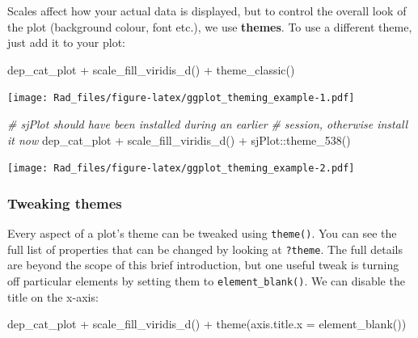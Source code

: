 \documentclass[
]{book}
\newenvironment{Shaded}{\begin{snugshade}}{\end{snugshade}}
\newcommand{\AttributeTok}[1]{\textcolor[rgb]{0.77,0.63,0.00}{#1}}
\newcommand{\CommentTok}[1]{\textcolor[rgb]{0.56,0.35,0.01}{\textit{#1}}}
\newcommand{\FunctionTok}[1]{\textcolor[rgb]{0.00,0.00,0.00}{#1}}
\newcommand{\NormalTok}[1]{#1}
\newcommand{\SpecialCharTok}[1]{\textcolor[rgb]{0.00,0.00,0.00}{#1}}
\begin{document}
Scales affect how your actual data is displayed, but to control the
overall look of the plot (background colour, font etc.), we use
\textbf{themes}. To use a different theme, just add it to your plot:

\begin{Shaded}
\begin{Highlighting}[]
\NormalTok{dep\_cat\_plot }\SpecialCharTok{+}
    \FunctionTok{scale\_fill\_viridis\_d}\NormalTok{() }\SpecialCharTok{+}
    \FunctionTok{theme\_classic}\NormalTok{()}
\end{Highlighting}
\end{Shaded}

\texttt{[image: Rad\_files/figure-latex/ggplot\_theming\_example-1.pdf]}

\begin{Shaded}
\begin{Highlighting}[]
\CommentTok{\# sjPlot should have been installed during an earlier}
\CommentTok{\#   session, otherwise install it now}
\NormalTok{dep\_cat\_plot }\SpecialCharTok{+}
    \FunctionTok{scale\_fill\_viridis\_d}\NormalTok{() }\SpecialCharTok{+}
\NormalTok{    sjPlot}\SpecialCharTok{::}\FunctionTok{theme\_538}\NormalTok{()}
\end{Highlighting}
\end{Shaded}

\texttt{[image: Rad\_files/figure-latex/ggplot\_theming\_example-2.pdf]}

\hypertarget{tweaking-themes}{%
\subsubsection{Tweaking themes}\label{tweaking-themes}}

Every aspect of a plot's theme can be tweaked using \texttt{theme()}.
You can see the full list of properties that can be changed by looking
at \texttt{?theme}.
The full details are beyond the scope of this brief introduction,
but one useful tweak is turning off particular elements by setting
them to \texttt{element\_blank()}. We can disable the title on the x-axis:

\begin{Shaded}
\begin{Highlighting}[]
\NormalTok{dep\_cat\_plot }\SpecialCharTok{+}
    \FunctionTok{scale\_fill\_viridis\_d}\NormalTok{() }\SpecialCharTok{+}
    \FunctionTok{theme}\NormalTok{(}\AttributeTok{axis.title.x =} \FunctionTok{element\_blank}\NormalTok{())}
\end{Highlighting}
\end{Shaded}
\end{document}
